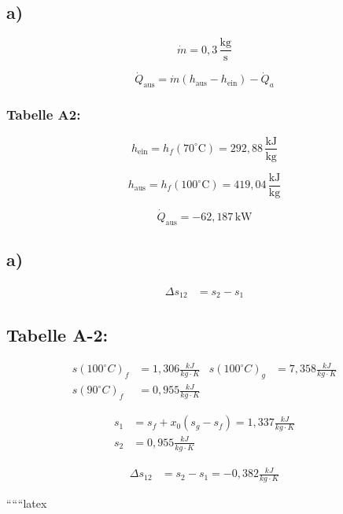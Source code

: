 

\subsection*{a)}

\[
\dot{m} = 0{,}3 \, \frac{\text{kg}}{\text{s}}
\]

\[
\dot{Q}_{\text{aus}} = \dot{m} \left( h_{\text{aus}} - h_{\text{ein}} \right) - \dot{Q}_{a}
\]

\subsubsection*{Tabelle A2:}

\[
h_{\text{ein}} = h_f \left( 70^\circ \text{C} \right) = 292{,}88 \, \frac{\text{kJ}}{\text{kg}}
\]

\[
h_{\text{aus}} = h_f \left( 100^\circ \text{C} \right) = 419{,}04 \, \frac{\text{kJ}}{\text{kg}}
\]

\[
\dot{Q}_{\text{aus}} = -62{,}187 \, \text{kW}
\]



\subsection*{a)}

\begin{align*}
\Delta s_{12} &= s_2 - s_1
\end{align*}

\subsection*{Tabelle A-2:}

\begin{align*}
s(100^\circ C)_f &= 1{,}306 \frac{kJ}{kg \cdot K} & s(100^\circ C)_g &= 7{,}358 \frac{kJ}{kg \cdot K} \\
s(90^\circ C)_f &= 0{,}955 \frac{kJ}{kg \cdot K}
\end{align*}

\begin{align*}
s_1 &= s_f + x_0 (s_g - s_f) = 1{,}337 \frac{kJ}{kg \cdot K} \\
s_2 &= 0{,}955 \frac{kJ}{kg \cdot K}
\end{align*}

\begin{align*}
\Delta s_{12} &= s_2 - s_1 = -0{,}382 \frac{kJ}{kg \cdot K}
\end{align*}

``````latex